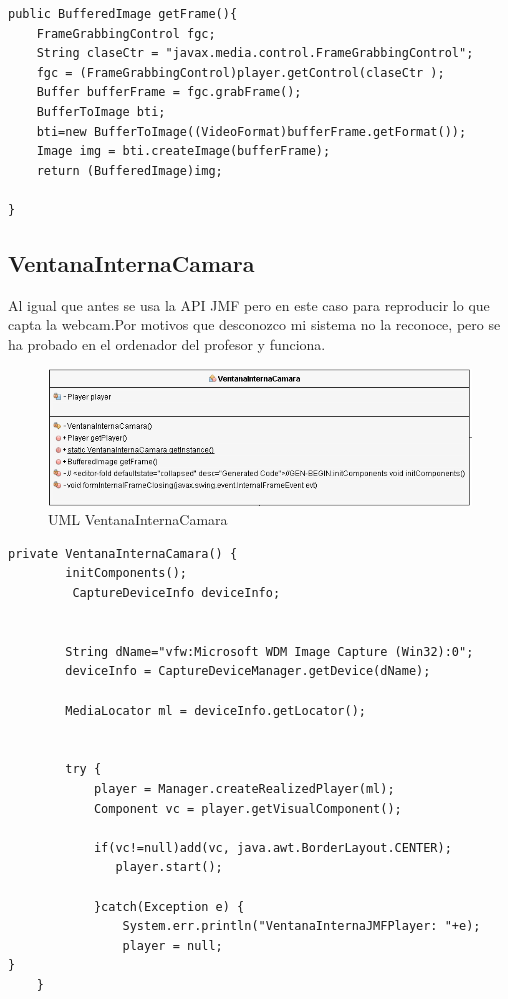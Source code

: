 \begin{lstlisting}
public BufferedImage getFrame(){
    FrameGrabbingControl fgc;
    String claseCtr = "javax.media.control.FrameGrabbingControl";
    fgc = (FrameGrabbingControl)player.getControl(claseCtr );
    Buffer bufferFrame = fgc.grabFrame();
    BufferToImage bti;
    bti=new BufferToImage((VideoFormat)bufferFrame.getFormat());
    Image img = bti.createImage(bufferFrame);
    return (BufferedImage)img;
   
}
\end{lstlisting}

\subsection{VentanaInternaCamara}
Al igual que antes se usa la API JMF pero en este caso para reproducir lo que capta la webcam.Por motivos que desconozco mi sistema no la reconoce, pero se ha probado en el ordenador del profesor y funciona.

\begin{figure}[H]
  \centering
    \includegraphics[scale=0.60]{images/ventanaInternaCamara}
  \caption{UML VentanaInternaCamara}
  \label{VentanaInternaCamara}
\end{figure}

\begin{lstlisting}
private VentanaInternaCamara() {
        initComponents();
         CaptureDeviceInfo deviceInfo;
        
       
        String dName="vfw:Microsoft WDM Image Capture (Win32):0";
        deviceInfo = CaptureDeviceManager.getDevice(dName);
       
        MediaLocator ml = deviceInfo.getLocator();
        
        
        try {
            player = Manager.createRealizedPlayer(ml);
            Component vc = player.getVisualComponent();
          
            if(vc!=null)add(vc, java.awt.BorderLayout.CENTER);
               player.start();
              
            }catch(Exception e) {
                System.err.println("VentanaInternaJMFPlayer: "+e);
                player = null;
}
    }
\end{lstlisting}


